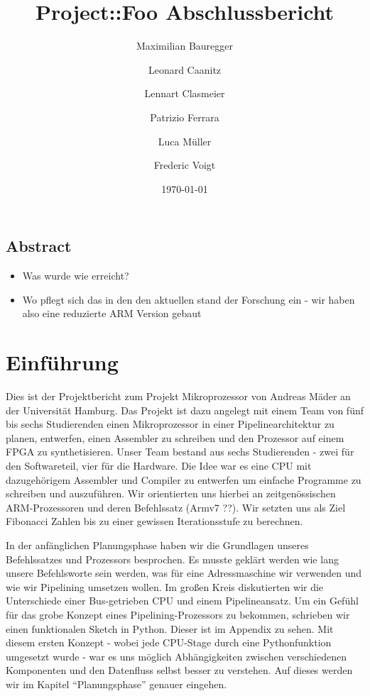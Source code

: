 \documentclass[paper=a4,fontsize=12pt,twocolumn]{scrreprt}
\title{Project::Foo Abschlussbericht}
\author{Maximilian Bauregger \and Leonard Caanitz \and Lennart Clasmeier \and Patrizio Ferrara \and Luca Müller \and Frederic Voigt}
\date{\today}
\begin{document}
\maketitle

\tableofcontents

\section*{Abstract}

\begin{itemize}
    \item Was wurde wie erreicht?
    \item Wo pflegt sich das in den den aktuellen stand der Forschung ein - wir haben also eine reduzierte ARM Version gebaut
\end{itemize}
\kant[1]


\chapter{Einführung}
Dies ist der Projektbericht zum Projekt Mikroprozessor von Andreas Mäder an der Universität Hamburg. %
Das Projekt ist dazu angelegt mit einem Team von fünf bis sechs Studierenden einen Mikroprozessor in einer Pipelinearchitektur zu planen, entwerfen, einen Assembler zu schreiben und den Prozessor auf einem FPGA zu synthetisieren.
Unser Team bestand aus sechs Studierenden - zwei für den Softwareteil, vier für die Hardware.
Die Idee war es eine CPU mit dazugehörigem Assembler und Compiler zu entwerfen um einfache Programme zu schreiben und auszuführen.
Wir orientierten uns hierbei an zeitgenössischen ARM-Prozessoren und deren Befehlssatz (Armv7 ??).
Wir setzten uns als Ziel Fibonacci Zahlen bis zu einer gewissen Iterationsstufe zu berechnen.

In der anfänglichen Planungsphase haben wir die Grundlagen unseres Befehlssatzes und Prozessors besprochen.
Es musste geklärt werden wie lang unsere Befehlsworte sein werden, was für eine Adressmaschine wir verwenden und wie wir Pipelining umsetzen wollen.
Im großen Kreis diskutierten wir die Unterschiede einer Bus-getrieben CPU und einem Pipelineansatz.
Um ein Gefühl für das grobe Konzept eines Pipelining-Prozessors zu bekommen, schrieben wir einen funktionalen Sketch in Python.
Dieser ist im Appendix zu sehen.
Mit diesem ersten Konzept - wobei jede CPU-Stage durch eine Pythonfunktion umgesetzt wurde - war es uns möglich Abhängigkeiten zwischen verschiedenen Komponenten und den Datenfluss selbst besser zu verstehen.
Auf dieses werden wir im Kapitel \enquote{Planungsphase} genauer eingehen.
\end{document}

